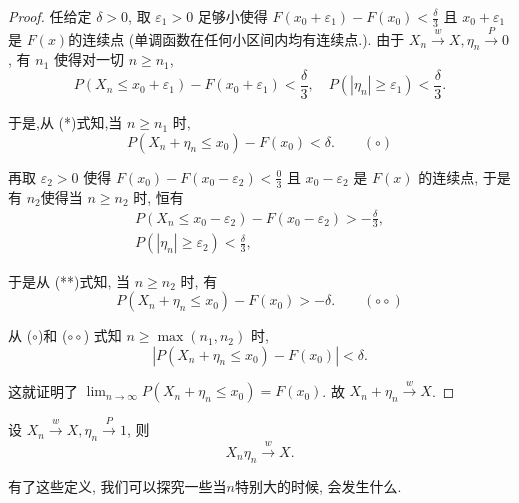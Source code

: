 {{\begin{proof}
任给定 $\delta>0$, 取 $\varepsilon_1>0$ 足够小使得 $F\left(x_0+\varepsilon_1\right)-F\left(x_0\right)<\frac{\delta}{3}$ 且 $x_0+\varepsilon_1$ 是 $F(x)$的连续点 (单调函数在任何小区间内均有连续点.). 由于 $X_n \stackrel{w}{\longrightarrow} X, \eta_n \stackrel{P}{\longrightarrow} 0$, 有 $n_1$ 使得对一切 $n \geqslant n_1$,
$$
P\left(X_n \leq x_0+\varepsilon_1\right)-F\left(x_0+\varepsilon_1\right)<\frac{\delta}{3}, \quad P\left(\left|\eta_n\right| \geqslant \varepsilon_1\right)<\frac{\delta}{3} .
$$

于是,从 (*)式知,当 $n \geqslant n_1$ 时,
$$
P\left(X_n+\eta_n \leq x_0\right)-F\left(x_0\right)<\delta . \qquad (\circ)
$$

再取 $\varepsilon_2>0$ 使得 $F\left(x_0\right)-F\left(x_0-\varepsilon_2\right)<\frac{0}{3}$ 且 $x_0-\varepsilon_2$ 是 $F(x)$ 的连续点, 于是有 $n_2$使得当 $n \geqslant n_2$ 时, 恒有
$$
\begin{gathered}
P\left(X_n \leq x_0-\varepsilon_2\right)-F\left(x_0-\varepsilon_2\right)>-\frac{\delta}{3}, \\
P\left(\left|\eta_n\right| \geqslant \varepsilon_2\right)<\frac{\delta}{3},
\end{gathered}
$$

于是从 (**)式知, 当 $n \geqslant n_2$ 时, 有
$$
P\left(X_n+\eta_n \leq x_0\right)-F\left(x_0\right)>-\delta . \quad \quad (\circ\circ)
$$

从 ($\circ$)和 ($\circ\circ$) 式知 $n \geqslant \max \left(n_1, n_2\right)$ 时,
$$
\left|P\left(X_n+\eta_n \leq x_0\right)-F\left(x_0\right)\right|<\delta .
$$

这就证明了 $\lim _{n \rightarrow \infty} P\left(X_n+\eta_n \leq x_0\right)=F\left(x_0\right)$. 故 $X_n+\eta_n \stackrel{w}{\longrightarrow} X$.
\end{proof}
}}

\begin{theorem}
    设 $X_n \stackrel{w}{\longrightarrow} X, \eta_n \stackrel{P}{\longrightarrow} 1$, 则
$$
X_n \eta_n \stackrel{w}{\longrightarrow} X .
$$
\end{theorem}

有了这些定义, 我们可以探究一些当$n$特别大的时候, 会发生什么.